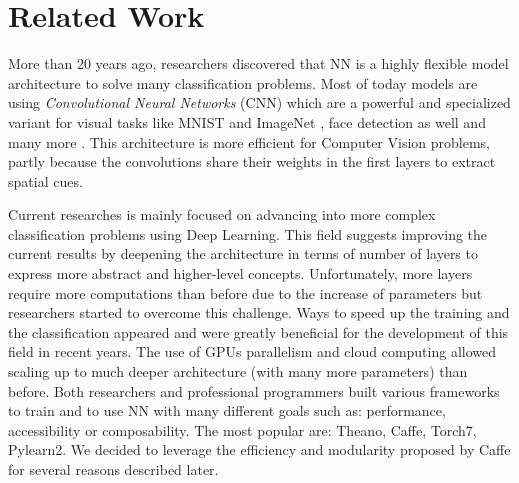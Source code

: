 \documentclass[a4paper,12pt]{report}
\begin{document}
\chapter{Related Work}
\label{chap:related}

More than 20 years ago, researchers discovered that NN is a highly flexible model architecture to solve many classification problems.
Most of today models are using {\em Convolutional Neural Networks} (CNN) which are a powerful and specialized variant for visual tasks like MNIST \cite{mnist_web} and ImageNet \cite{krizhevsky2012imagenet}, face detection as well \cite{rowley1998neural} and many more \cite{prechelt1994proben1}.
This architecture is more efficient for Computer Vision problems, partly because the convolutions share their weights in the first layers to extract spatial cues.

Current researches is mainly focused on advancing into more complex classification problems using Deep Learning.
This field suggests improving the current results by deepening the architecture in terms of number of layers to express more abstract and higher-level concepts.
Unfortunately, more layers require more computations than before due to the increase of parameters but researchers started to overcome this challenge.
Ways to speed up the training and the classification appeared and were greatly beneficial for the development of this field in recent years\cite{ciresan2011flexible}\cite{schmidhuber2015deep}\cite{nasse2009face}.
The use of GPUs parallelism and cloud computing allowed scaling up to much deeper architecture (with many more parameters) than before\cite{coates2013deep}.
Both researchers and professional programmers built various frameworks to train and to use NN with many different goals such as: performance, accessibility or composability.
The most popular are: Theano\cite{bastien2012theano}, Caffe\cite{jia2014caffe}, Torch7\cite{collobert2011torch7}, Pylearn2\cite{goodfellow2013pylearn2}.
We decided to leverage the efficiency and modularity proposed by Caffe for several reasons described later.
\end{document}
